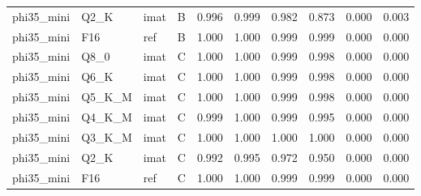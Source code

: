 \begin{tabular}{llllrrrrrr}
phi35\_mini & Q2\_K & imat & B & 0.996 & 0.999 & 0.982 & 0.873 & 0.000 & 0.003 \\
phi35\_mini & F16 & ref & B & 1.000 & 1.000 & 0.999 & 0.999 & 0.000 & 0.000 \\
phi35\_mini & Q8\_0 & imat & C & 1.000 & 1.000 & 0.999 & 0.998 & 0.000 & 0.000 \\
phi35\_mini & Q6\_K & imat & C & 1.000 & 1.000 & 0.999 & 0.998 & 0.000 & 0.000 \\
phi35\_mini & Q5\_K\_M & imat & C & 1.000 & 1.000 & 0.999 & 0.998 & 0.000 & 0.000 \\
phi35\_mini & Q4\_K\_M & imat & C & 0.999 & 1.000 & 0.999 & 0.995 & 0.000 & 0.000 \\
phi35\_mini & Q3\_K\_M & imat & C & 1.000 & 1.000 & 1.000 & 1.000 & 0.000 & 0.000 \\
phi35\_mini & Q2\_K & imat & C & 0.992 & 0.995 & 0.972 & 0.950 & 0.000 & 0.000 \\
phi35\_mini & F16 & ref & C & 1.000 & 1.000 & 0.999 & 0.999 & 0.000 & 0.000 \\
\bottomrule
\end{tabular}
